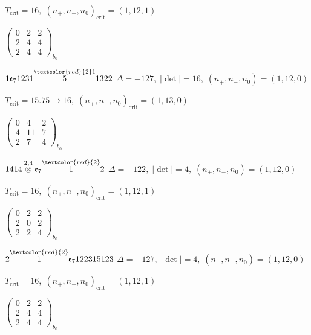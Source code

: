 \documentclass[10pt]{article}
\begin{document}
\hspace{1em}$T_{\text{crit}}=16,\; (n_+,n_-,n_0)_{\text{crit}}=(1,12,1)$

\hspace{2em}$\left(\begin{smallmatrix}0 & 2 & 2 \\ 2 & 4 & 4 \\ 2 & 4 & 4\end{smallmatrix}\right)_{\!b_0}$

\smallskip

$1\mathfrak{e}_71231\overset{\textcolor{red}{2}1}{5}1322$ \quad $\Delta=-127,\; |\det|=16,\; (n_+,n_-,n_0)=(1,12,0)$

\hspace{1em}$T_{\text{crit}}=15.75 \to 16,\; (n_+,n_-,n_0)_{\text{crit}}=(1,13,0)$

\hspace{2em}$\left(\begin{smallmatrix}0 & 4 & 2 \\ 4 & 11 & 7 \\ 2 & 7 & 4\end{smallmatrix}\right)_{\!b_0}$

\smallskip

$1414\overset{2,4}{\otimes}\mathfrak{e}_7\overset{\textcolor{red}{2}}{1}2$ \quad $\Delta=-122,\; |\det|=4,\; (n_+,n_-,n_0)=(1,12,0)$

\hspace{1em}$T_{\text{crit}}=16,\; (n_+,n_-,n_0)_{\text{crit}}=(1,12,1)$

\hspace{2em}$\left(\begin{smallmatrix}0 & 2 & 2 \\ 2 & 0 & 2 \\ 2 & 2 & 4\end{smallmatrix}\right)_{\!b_0}$

\smallskip

$2\overset{\textcolor{red}{2}}{1}\mathfrak{e}_7122315123$ \quad $\Delta=-127,\; |\det|=4,\; (n_+,n_-,n_0)=(1,12,0)$

\hspace{1em}$T_{\text{crit}}=16,\; (n_+,n_-,n_0)_{\text{crit}}=(1,12,1)$

\hspace{2em}$\left(\begin{smallmatrix}0 & 2 & 2 \\ 2 & 4 & 4 \\ 2 & 4 & 4\end{smallmatrix}\right)_{\!b_0}$
\end{document}
